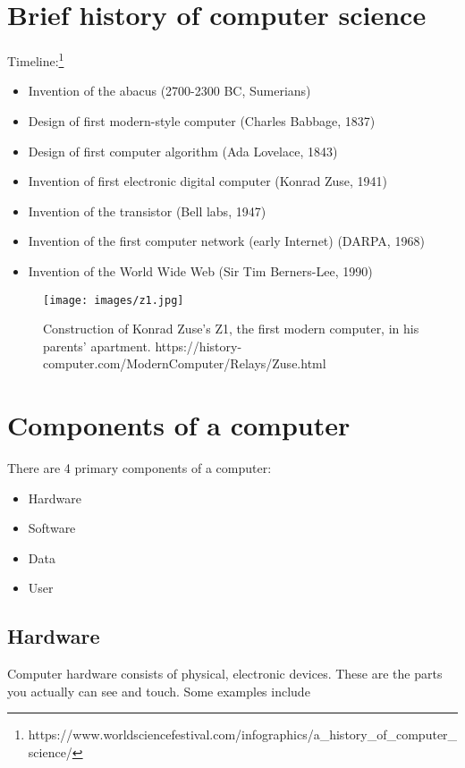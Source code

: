 \section{Brief history of computer science}

Timeline:\footnote{https://www.worldsciencefestival.com/infographics/a\_history\_of\_computer\_science/}
\begin{itemize}
\item Invention of the abacus (2700-2300 BC, Sumerians)
\item Design of first modern-style computer (Charles Babbage, 1837)
\item Design of first computer algorithm (Ada Lovelace, 1843)
\item Invention of first electronic digital computer (Konrad Zuse, 1941)
\item Invention of the transistor (Bell labs, 1947)
\item Invention of the first computer network (early Internet) (DARPA, 1968)
\item Invention of the World Wide Web (Sir Tim Berners-Lee, 1990)
\end{itemize}

\begin{figure}
	\centering
	\texttt{[image: images/z1.jpg]}
	\caption{Construction of Konrad Zuse's Z1, the first modern computer, in his
    parents' apartment.
    https://history-computer.com/ModernComputer/Relays/Zuse.html}
	\label{fig:z1}
\end{figure}

\section{Components of a computer}

There are 4 primary components of a computer:

\begin{itemize}
	\item Hardware
	\item Software
	\item Data
	\item User
\end{itemize}

\subsection{Hardware}

Computer hardware consists of physical, electronic devices. These are the parts you actually can see and touch. Some examples include

